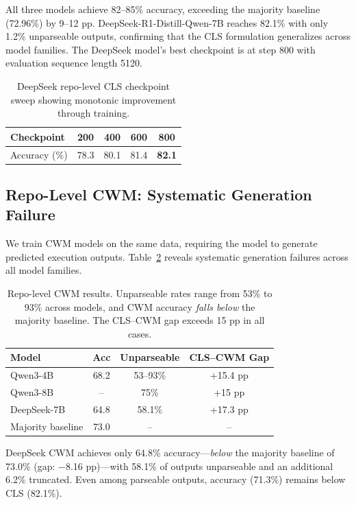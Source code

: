 \documentclass[11pt,a4paper]{article}
\begin{document}
All three models achieve 82--85\% accuracy, exceeding the majority baseline (72.96\%) by 9--12 pp.
DeepSeek-R1-Distill-Qwen-7B reaches 82.1\% with only 1.2\% unparseable outputs, confirming that the CLS formulation generalizes across model families.
The DeepSeek model's best checkpoint is at step 800 with evaluation sequence length 5120.

\begin{table}[t]
\centering
\small
\begin{tabular}{lcccc}
\toprule
\textbf{Checkpoint} & \textbf{200} & \textbf{400} & \textbf{600} & \textbf{800} \\
\midrule
Accuracy (\%) & 78.3 & 80.1 & 81.4 & \textbf{82.1} \\
\bottomrule
\end{tabular}
\caption{DeepSeek repo-level CLS checkpoint sweep showing monotonic improvement through training.}
\label{tab:ds-cls-sweep}
\end{table}

\subsection{Repo-Level CWM: Systematic Generation Failure}
\label{sec:repo-cwm}

We train CWM models on the same data, requiring the model to generate predicted execution outputs.
Table~\ref{tab:repo-cwm} reveals systematic generation failures across all model families.

\begin{table}[t]
\centering
\small
\begin{tabular}{lccc}
\toprule
\textbf{Model} & \textbf{Acc} & \textbf{Unparseable} & \textbf{CLS--CWM Gap} \\
\midrule
Qwen3-4B & 68.2 & 53--93\% & +15.4 pp \\
Qwen3-8B & -- & 75\% & +15 pp \\
DeepSeek-7B & 64.8 & 58.1\% & +17.3 pp \\
\midrule
Majority baseline & 73.0 & -- & -- \\
\bottomrule
\end{tabular}
\caption{Repo-level CWM results. Unparseable rates range from 53\% to 93\% across models, and CWM accuracy \emph{falls below} the majority baseline. The CLS--CWM gap exceeds 15 pp in all cases.}
\label{tab:repo-cwm}
\end{table}

DeepSeek CWM achieves only 64.8\% accuracy---\emph{below} the majority baseline of 73.0\% (gap: $-$8.16 pp)---with 58.1\% of outputs unparseable and an additional 6.2\% truncated.
Even among parseable outputs, accuracy (71.3\%) remains below CLS (82.1\%).
\end{document}
